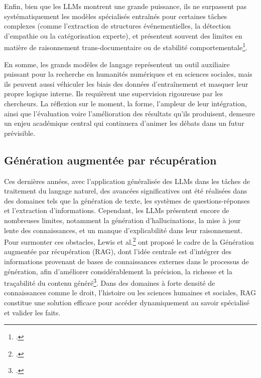 \documentclass[a4paper,twoside,12pt]{book}
\begin{document}
Enfin, bien que les LLMs montrent une grande puissance, ils ne surpassent pas systématiquement les modèles spécialisés entraînés pour certaines tâches complexes (comme l'extraction de structures événementielles, la détection d'empathie ou la catégorisation experte), et présentent souvent des limites en matière de raisonnement trans-documentaire ou de stabilité comportementale\footcite{ziems2024}.

En somme, les grands modèles de langage représentent un outil auxiliaire puissant pour la recherche en humanités numériques et en sciences sociales, mais ils peuvent aussi véhiculer les biais des données d'entraînement et masquer leur propre logique interne. Ils requièrent une supervision rigoureuse par les chercheurs. La réflexion sur le moment, la forme, l'ampleur de leur intégration, ainsi que l'évaluation voire l'amélioration des résultats qu'ils produisent, demeure un enjeu académique central qui continuera d'animer les débats dans un futur prévisible.


\subsection{Génération augmentée par récupération}
Ces dernières années, avec l'application généralisée des LLMs dans les tâches de traitement du langage naturel, des avancées significatives ont été réalisées dans des domaines tels que la génération de texte, les systèmes de questions-réponses et l'extraction d'informations. Cependant, les LLMs présentent encore de nombreuses limites, notamment la génération d'hallucinations, la mise à jour lente des connaissances, et un manque d'explicabilité dans leur raisonnement. Pour surmonter ces obstacles, Lewis et al.\footcite{lewis2021} ont proposé le cadre de la Génération augmentée par récupération (RAG), dont l'idée centrale est d'intégrer des informations provenant de bases de connaissances externes dans le processus de génération, afin d'améliorer considérablement la précision, la richesse et la traçabilité du contenu généré\footcite{gao2024}. Dans des domaines à forte densité de connaissances comme le droit, l'histoire ou les sciences humaines et sociales, RAG constitue une solution efficace pour accéder dynamiquement au savoir spécialisé et valider les faits.
\end{document}
